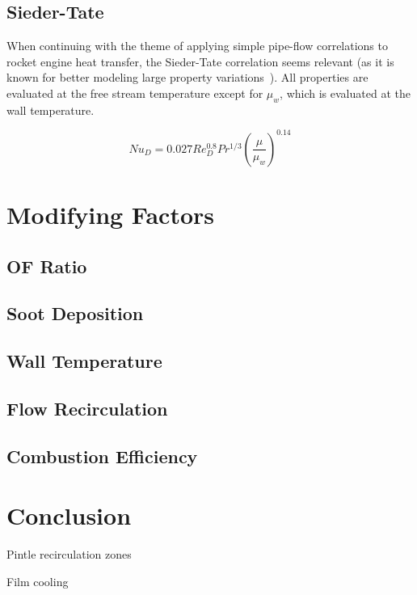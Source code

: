 \documentclass[11pt]{article}
\begin{document}
\subsection{Sieder-Tate}

When continuing with the theme of applying simple pipe-flow correlations to rocket engine heat transfer, the Sieder-Tate correlation seems relevant (as it is known for better modeling large property variations~\cite{bergman_fundamentals_2017}). All properties are evaluated at the free stream temperature except for $\mu_w$, which is evaluated at the wall temperature.

\begin{equation}
  Nu_{D} = 0.027 Re_{D}^{0.8} Pr^{1/3} \left( \frac{\mu}{\mu_w} \right)^{0.14}
\end{equation}

\section{Modifying Factors}

\subsection{OF Ratio}

\subsection{Soot Deposition}

\subsection{Wall Temperature}\label{sec:wall_temp}

\subsection{Flow Recirculation}

\subsection{Combustion Efficiency}

\section{Conclusion}

Pintle recirculation zones

Film cooling

\printbibliography
\end{document}
